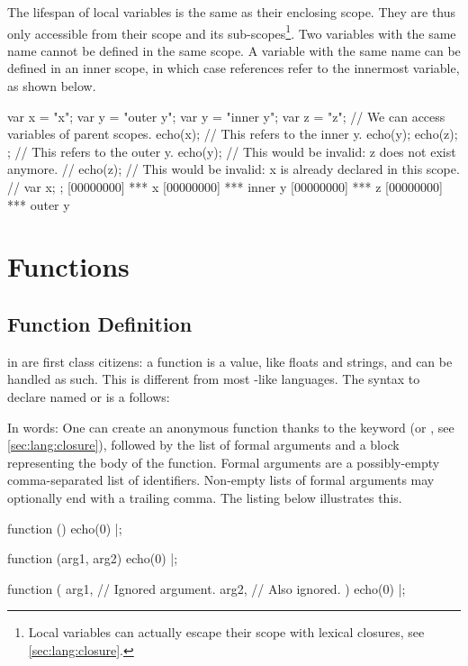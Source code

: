 The lifespan of local variables is the same as their enclosing scope. They
are thus only accessible from their scope and its
sub-scopes\footnote{Local variables can actually escape their scope
  with lexical closures, see \autoref{sec:lang:closure}.}. Two
variables with the same name cannot be defined in the same scope. A
variable with the same name can be defined in an inner scope, in which
case references refer to the innermost variable, as shown below.

\begin{urbiscript}
{
  var x = "x";
  var y = "outer y";
  {
    var y = "inner y";
    var z = "z";
    // We can access variables of parent scopes.
    echo(x);
    // This refers to the inner y.
    echo(y);
    echo(z);
  };
  // This refers to the outer y.
  echo(y);
  // This would be invalid: z does not exist anymore.
  // echo(z);
  // This would be invalid: x is already declared in this scope.
  // var x;
};
[00000000] *** x
[00000000] *** inner y
[00000000] *** z
[00000000] *** outer y
\end{urbiscript}


\section{Functions}

\subsection{Function Definition}
\label{sec:lang:function}
 in \us are first class citizens: a function is a value, like
floats and strings, and can be handled as such.  This is different from most
\langC-like languages.  The syntax to declare named or 
is a follows:


In words: One can create an anonymous function thanks to the
 keyword (or , see
\autoref{sec:lang:closure}), followed by the list of formal arguments and
a block representing the body of the function.  Formal arguments are a
possibly-empty comma-separated list of identifiers.  Non-empty lists of
formal arguments may optionally end with a trailing comma. The listing below
illustrates this.

\begin{urbiscript}
function () { echo(0) }|;

function (arg1, arg2) { echo(0) }|;

function (
           arg1, // Ignored argument.
           arg2, // Also ignored.
          )
{
  echo(0)
}|;
\end{urbiscript}

